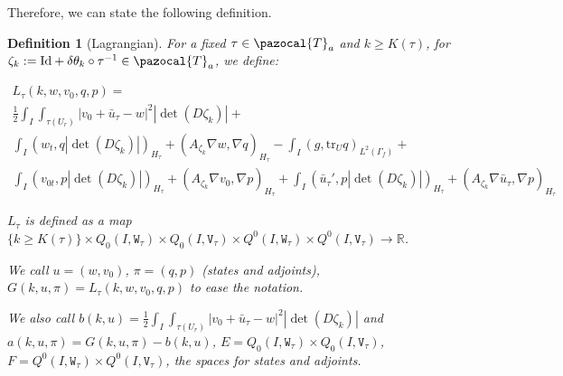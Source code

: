\documentclass[english,a4paper,9pt,oneside]{scrbook}	%
\theoremstyle{break}
\newtheorem{defn}[equation]{Definition}
\theoremstyle{remark}
\newcommand{\mR}{\mathbb{R}}
\newcommand{\tr}{\text{tr}}
\newcommand{\cT}{\pazocal{T}}
\newcommand{\id}{\text{Id}}
\newcommand{\te}{\theta}
\newcommand{\tw}[1]{\texttt{#1}}
\begin{document}


Therefore, we can state the following definition.

\begin{defn}[Lagrangian]

For a fixed $\tau \in \cT_a$ and  $k\geq K(\tau)$, for $\zeta_k:=\id+\delta\te_k \circ \tau^{-1} \in \cT_a$, we define:

\begin{align*}
L_\tau(k,w,v_0,q,p) = \\
\frac{1}{2}\int_I \int_{\tau(U_r)}|v_0+\bar{u}_\tau - w|^2|\det(D\zeta_k)|+\\
\int_I ( w_t , q |\det(D\zeta_k)|)_{H_\tau}+ (A_{\zeta_k}\nabla w, \nabla q)_{H_\tau} -\int_I(g,\tr_{U} q)_{L^2(\Gamma_f)} +\\ \int_I (v_{0t},p |\det(D\zeta_k)|)_{H_\tau} + (A_{\zeta_k} \nabla v_0, \nabla p)_{H_\tau}+\int_I(\bar{u}_\tau',p|\det(D\zeta_k)|)_{H_\tau}+(A_{\zeta_k} \nabla \bar{u}_\tau , \nabla p)_{H_\tau}
\end{align*}

$L_\tau$ is defined as a map $\{k\geq K(\tau)\}\times Q_0(I, \tw{W}_\tau)\times Q_0(I,\tw{V}_\tau)\times Q^0(I, \tw{W}_\tau)\times Q^0(I, \tw{V}_\tau)\rightarrow \mR$.

We call $u = (w,v_0)$, $\pi = (q,p)$ (states and adjoints), $G(k,u,\pi) = L_\tau(k,w,v_0,q,p)$ to ease the notation.

We also call $b(k, u) = \frac{1}{2}\int_I \int_{\tau(U_r)}|v_0+\bar{u}_\tau - w|^2|\det(D\zeta_k)|$ and $a(k, u,\pi) = G(k,u,\pi)-b(k, u)$, $E = Q_0(I, \tw{W}_\tau)\times Q_0(I,\tw{V}_\tau)$, $F=Q^0(I, \tw{W}_\tau)\times Q^0(I, \tw{V}_\tau)$, the spaces for states and adjoints.

\end{defn}
\end{document}

